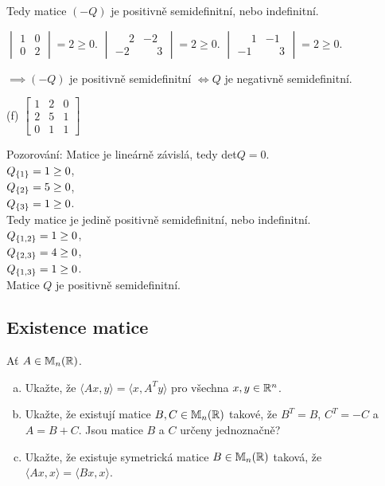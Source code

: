 Tedy matice $(-Q)$ je positivně semidefinitní, nebo indefinitní.

$\begin{vmatrix}
    1 & 0 \\
    0 & 2
\end{vmatrix} = 2 \geq 0$.
$\begin{vmatrix}
    \phantom{-}2 & -2 \\
    -2 & \phantom{-}3
\end{vmatrix} = 2 \geq 0$.
$\begin{vmatrix}
    \phantom{-}1 & -1 \\
    -1 & \phantom{-}3
\end{vmatrix} = 2 \geq 0$.

$\implies (-Q)$ je positivně semidefinitní $\iff Q$ je negativně semidefinitní.

(f)
$\begin{bmatrix}
    1 & 2 & 0 \\
    2 & 5 & 1 \\
    0 & 1 & 1
\end{bmatrix}$

Pozorování: Matice je lineárně závislá, tedy det$Q = 0$. \\
$Q_{\left\lbrace 1 \right\rbrace} = 1 \geq 0$,\\
$Q_{\left\lbrace 2 \right\rbrace} = 5 \geq 0$,\\
$Q_{\left\lbrace 3 \right\rbrace} = 1 \geq 0$.\\
Tedy matice je jedině positivně semidefinitní, nebo indefinitní.\\
$Q_{\left\lbrace 1,2 \right\rbrace} = 1 \geq 0$,\\
$Q_{\left\lbrace 2,3 \right\rbrace} = 4 \geq 0$,\\
$Q_{\left\lbrace 1,3 \right\rbrace} = 1 \geq 0$.\\
Matice $Q$ je positivně semidefinitní.

\subsection{Existence matice}
Ať $A \in \mathbb{M}_n (\mathbb{R})$.
\begin{enumerate}[(a)]
    \item Ukažte, že $\langle Ax, y \rangle = \langle x, A^T y \rangle$ pro všechna $x, y \in \mathbb{R}^n$.
    \item Ukažte, že existují matice $B, C \in \mathbb{M}_n (\mathbb{R})$ takové, že $B^T = B$, $C^T = -C$ a $A = B + C$. Jsou
    matice $B$ a $C$ určeny jednoznačně?
    \item Ukažte, že existuje symetrická matice $B \in \mathbb{M}_n (\mathbb{R})$ taková, že $\langle Ax, x \rangle =
    \langle Bx, x \rangle$.
\end{enumerate}


